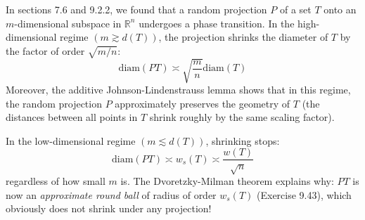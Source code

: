 \begin{remark}
\label{rmk:9.7.5}
In sections 7.6 and 9.2.2, we found that a random projection $P$ of a set $T$ onto an $m$-dimensional subspace 
in $\mathbb{R}^n$ undergoes a phase transition. In the high-dimensional regime $(m \gtrsim d(T))$, the 
projection shrinks the diameter of $T$ by the factor of order $\sqrt{m/n}$: 
\[ \mathrm{diam}(PT) \asymp \sqrt{\frac{m}{n}} \mathrm{diam}(T)  \]
Moreover, the additive Johnson-Lindenstrauss lemma shows that in this regime, the random projection $P$ 
approximately preserves the geometry of $T$ (the distances between all points in $T$ shrink roughly by the same 
scaling factor).

In the low-dimensional regime $(m \lesssim d(T))$, shrinking stops:
\[ \mathrm{diam}(PT) \asymp w_s(T) \asymp \frac{w(T)}{\sqrt{n}} \]
regardless of how small $m$ is. The Dvoretzky-Milman theorem explains why: $PT$ is now an \textit{approximate 
round ball} of radius of order $w_s(T)$ (Exercise 9.43), which obviously does not shrink under any projection!
\end{remark}


